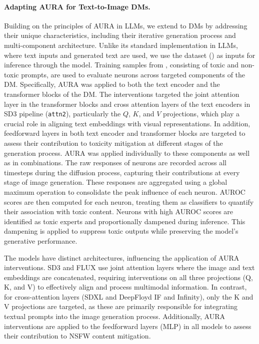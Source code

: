 \paragraph{Adapting AURA for Text-to-Image DMs.}
Building on the principles of AURA in LLMs, we extend to DMs by addressing their unique characteristics, including their iterative generation process and multi-component architecture. Unlike its standard implementation in LLMs, where text inputs and generated text are used, we use the \bench dataset ()
as inputs for inference through the model. Training samples from \bench, consisting of toxic and non-toxic prompts, are used to evaluate neurons across targeted components of the DM. Specifically, AURA was applied to both the text encoder and the transformer blocks of the DM. The interventions targeted the joint attention layer in the transformer blocks and cross attention layers of the text encoders in SD3 pipeline (\texttt{attn2}), particularly the $Q$, $K$, and $V$ projections, which play a crucial role in aligning text embeddings with visual representations. In addition, feedforward layers in both text encoder and transformer blocks are targeted to assess their contribution to toxicity mitigation at different stages of the generation process. AURA was applied individually to these components as well as in combinations. The raw responses of neurons are recorded across all timesteps during the diffusion process, capturing their contributions at every stage of image generation. These responses are aggregated using a global maximum operation to consolidate the peak influence of each neuron. AUROC scores are then computed for each neuron, treating them as classifiers to quantify their association with toxic content. Neurons with high AUROC scores are identified as toxic experts and proportionally dampened during inference. This dampening is applied to suppress toxic outputs while preserving the model’s generative performance.

The models have distinct architectures, influencing the application of AURA interventions. SD3 and FLUX use joint attention layers where the image and text embeddings are concatenated, requiring interventions on all three projections (Q, K, and V) to effectively align and process multimodal information. In contrast, for cross-attention layers (SDXL and DeepFloyd IF and Infinity), only the K and V projections are targeted, as these are primarily responsible for integrating textual prompts into the image generation process. Additionally, AURA interventions are applied to the feedforward layers (MLP) in all models to assess their contribution to NSFW content mitigation.


